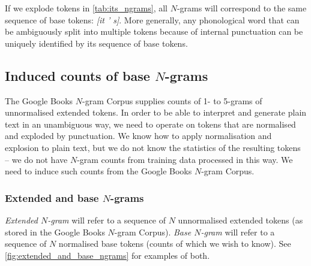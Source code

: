 \documentclass[draft]{IIBproject}
\DeclareRobustCommand{\ngram}[1]{\emph{[#1]}}
\begin{document}
If we explode tokens in \cref{tab:its_ngrams}, all $N$-grams will correspond to the same sequence of base tokens: \ngram{it ' s}. More generally, any phonological word that can be ambiguously split into multiple tokens because of internal punctuation can be uniquely identified by its sequence of base tokens.

\FloatBarrier
\subsection{Induced counts of base $N$-grams}

The Google Books $N$-gram Corpus supplies counts of 1- to 5-grams of unnormalised extended tokens. In order to be able to interpret and generate plain text in an unambiguous way, we need to operate on tokens that are normalised and exploded by punctuation. We know how to apply normalisation and explosion to plain text, but we do not know the statistics of the resulting tokens -- we do not have $N$-gram counts from training data processed in this way. We need to induce such counts from the Google Books $N$-gram Corpus.

\subsubsection{Extended and base $N$-grams}

\emph{Extended $N$-gram} will refer to a sequence of $N$ unnormalised extended tokens (as stored in the Google Books $N$-gram Corpus). \emph{Base $N$-gram} will refer to a sequence of $N$ normalised base tokens (counts of which we wish to know). See \cref{fig:extended_and_base_ngrams} for examples of both.

%
\newcommand{\ngramMark}[3] {
	\draw [very thick] (#1,#3)--(#2,#3);
}

%
\newcommand{\extendedTokenDelimiter}[1] {
	\draw (#1,-19)--(#1,14.5);
}

%
\newcommand{\baseTokenDelimiter}[1] {
	\draw [dotted] (#1,-19)--(#1,14.5);
}
\end{document}
